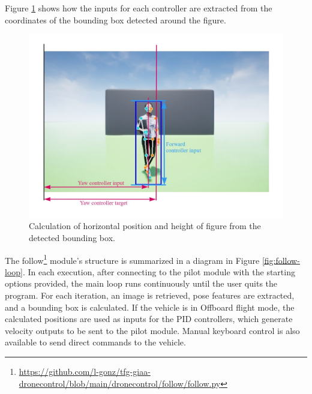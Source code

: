 Figure \ref{fig:follow-input-calcs} shows how the inputs for each controller are extracted from the coordinates of the bounding box detected around the figure.
\begin{figure}[H]
  \centering
  \includegraphics[width=\textwidth, keepaspectratio]{img/pose-calculations.jpg}
  \caption{Calculation of horizontal position and height of figure from the detected bounding box.}
  \label{fig:follow-input-calcs}
\end{figure}


The follow\footnote{\url{https://github.com/l-gonz/tfg-giaa-dronecontrol/blob/main/dronecontrol/follow/follow.py}} module's structure is summarized in a diagram in Figure \ref{fig:follow-loop}.
In each execution, after connecting to the pilot module with the starting options provided, the main loop runs continuously until the user quits the program.
For each iteration, an image is retrieved, pose features are extracted, and a bounding box is calculated. If the vehicle is in Offboard flight mode, the calculated positions are used as inputs for the PID controllers, which generate velocity outputs to be sent to the pilot module. Manual keyboard control is also available to send direct commands to the vehicle.

